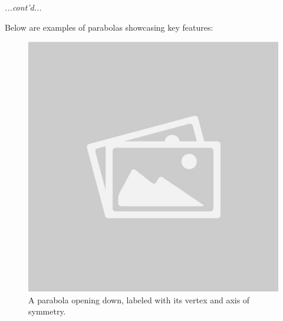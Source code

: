 \documentclass{article}
\begin{document}
\begin{definitionbox}
    \textit{...cont'd...}
    \begin{illustrationbox}
        Below are examples of parabolas showcasing key features:  
        \begin{figure}[H]
            \centering
            \begin{minipage}{0.45\textwidth}
                \centering
                \includegraphics[width=\textwidth]{sample_image1.jpg}
                \caption{A parabola opening down, labeled with its vertex and axis of symmetry.}
                \label{fig:parabola_down}
            \end{minipage}
            \hspace{0.05\textwidth} %
            \begin{minipage}{0.45\textwidth}
                \centering

\end{minipage}
\end{figure}
\end{illustrationbox}
\end{definitionbox}
\end{document}
